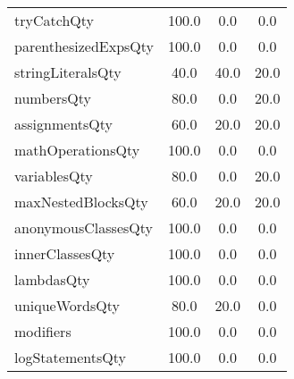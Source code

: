 \begin{tabular}{lccc}
tryCatchQty & 100.0 & 0.0 & 0.0 \\
parenthesizedExpsQty & 100.0 & 0.0 & 0.0 \\
stringLiteralsQty & 40.0 & 40.0 & 20.0 \\
numbersQty & 80.0 & 0.0 & 20.0 \\
assignmentsQty & 60.0 & 20.0 & 20.0 \\
mathOperationsQty & 100.0 & 0.0 & 0.0 \\
variablesQty & 80.0 & 0.0 & 20.0 \\
maxNestedBlocksQty & 60.0 & 20.0 & 20.0 \\
anonymousClassesQty & 100.0 & 0.0 & 0.0 \\
innerClassesQty & 100.0 & 0.0 & 0.0 \\
lambdasQty & 100.0 & 0.0 & 0.0 \\
uniqueWordsQty & 80.0 & 20.0 & 0.0 \\
modifiers & 100.0 & 0.0 & 0.0 \\
logStatementsQty & 100.0 & 0.0 & 0.0 \\
\bottomrule
              \end{tabular}
            